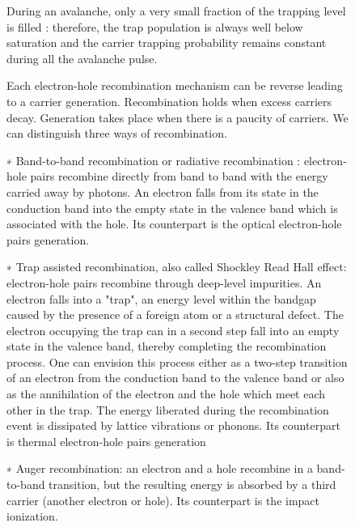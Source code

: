 \begin{figure}[!hbtp]



  
  
  During an avalanche, only a very small fraction of the trapping level is filled : therefore, the trap population is always well below saturation and 
  the carrier trapping probability remains constant during all the avalanche pulse. 
  
  Each electron-hole recombination mechanism can be reverse leading to a carrier generation. Recombination holds when excess carriers decay. 
  Generation takes place when there is a paucity of carriers. We can distinguish three ways of recombination. 
  
  ∗ Band-to-band recombination or radiative recombination : electron-hole pairs recombine directly from band to band with the energy carried away by photons.
  An electron falls from its state in the conduction band into the empty state in the valence band which is associated with the hole. Its counterpart is the 
  optical electron-hole pairs generation.
  
  ∗ Trap assisted recombination, also called Shockley Read Hall effect: electron-hole pairs recombine through deep-level impurities. An electron falls 
  into a "trap", an energy level within the bandgap caused by the presence of a foreign atom or a structural defect. The electron occupying the trap can in 
  a second step fall into an empty state in the valence band, thereby completing the recombination process. One can envision this process either as a 
  two-step transition of an electron from the conduction band to the valence band or also as the annihilation of the electron and the hole which meet each other in the trap.
  The energy liberated during the recombination event is dissipated by lattice vibrations or
  phonons. Its counterpart is thermal electron-hole pairs generation
  
  ∗ Auger recombination: an electron and a hole recombine in a band-to-band transition,
  but the resulting energy is absorbed by a third carrier (another electron or hole). Its
  counterpart is the impact ionization.
  

\end{figure}
